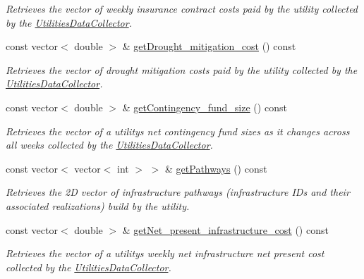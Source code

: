 \begin{DoxyCompactItemize}
\begin{DoxyCompactList}\small\item\em Retrieves the vector of weekly insurance contract costs paid by the utility collected by the {\ttfamily \mbox{\hyperlink{classUtilitiesDataCollector}{Utilities\+Data\+Collector}}}. \end{DoxyCompactList}\item 
const vector$<$ double $>$ \& \mbox{\hyperlink{classUtilitiesDataCollector_a911a0651222ac1d8185eef001fdb2ea8}{get\+Drought\+\_\+mitigation\+\_\+cost}} () const
\begin{DoxyCompactList}\small\item\em Retrieves the vector of drought mitigation costs paid by the utility collected by the {\ttfamily \mbox{\hyperlink{classUtilitiesDataCollector}{Utilities\+Data\+Collector}}}. \end{DoxyCompactList}\item 
const vector$<$ double $>$ \& \mbox{\hyperlink{classUtilitiesDataCollector_a2fa923f7d2df2a31a20294279572aeb6}{get\+Contingency\+\_\+fund\+\_\+size}} () const
\begin{DoxyCompactList}\small\item\em Retrieves the vector of a utility\textquotesingle{}s net contingency fund sizes as it changes across all weeks collected by the {\ttfamily \mbox{\hyperlink{classUtilitiesDataCollector}{Utilities\+Data\+Collector}}}. \end{DoxyCompactList}\item 
const vector$<$ vector$<$ int $>$ $>$ \& \mbox{\hyperlink{classUtilitiesDataCollector_a0e09af9bbb446c502c0d10be477dcf00}{get\+Pathways}} () const
\begin{DoxyCompactList}\small\item\em Retrieves the 2D vector of infrastructure pathways (infrastructure I\+Ds and their associated realizations) build by the utility. \end{DoxyCompactList}\item 
const vector$<$ double $>$ \& \mbox{\hyperlink{classUtilitiesDataCollector_a90a0dbf95c1eaf8325c3703764408f84}{get\+Net\+\_\+present\+\_\+infrastructure\+\_\+cost}} () const
\begin{DoxyCompactList}\small\item\em Retrieves the vector of a utility\textquotesingle{}s weekly net infrastructure net present cost collected by the {\ttfamily \mbox{\hyperlink{classUtilitiesDataCollector}{Utilities\+Data\+Collector}}}. \end{DoxyCompactList}\item 

\end{DoxyCompactItemize}
